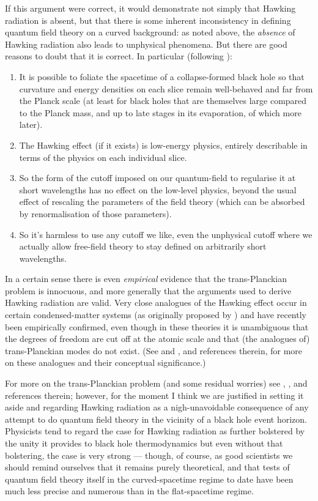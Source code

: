 \documentclass[12pt]{article}
\begin{document}
If this argument were correct, it would demonstrate not simply that Hawking radiation is absent, but that there is some inherent inconsistency in defining quantum field theory on a curved background: as noted above, the \emph{absence} of Hawking radiation also leads to unphysical phenomena. But there are good reasons to doubt that it is correct. In particular (following ):
 \begin{enumerate}
 \item It is possible to foliate the spacetime of a collapse-formed black hole so that curvature and energy densities on each slice remain well-behaved and far from the Planck scale (at least for black holes that are themselves large compared to the Planck mass, and up to late stages in its evaporation, of which more later).
 \item The Hawking effect (if it exists) is low-energy physics, entirely describable in terms of the physics on each individual slice.
 \item So the form of the cutoff imposed on our quantum-field to regularise it at short wavelengths has no effect on the low-level physics, beyond the usual effect of rescaling the parameters of the field theory (which can be absorbed by renormalisation of those parameters).
 \item So it's harmless to use any cutoff we like, even the unphysical cutoff where we actually allow free-field theory to stay defined on arbitrarily short wavelengths. 
 \end{enumerate}
In a certain sense there is even \emph{empirical} evidence that the trans-Planckian problem is innocuous, and more generally that the arguments used to derive Hawking radiation are valid. Very close analogues of the Hawking effect occur in certain condensed-matter systems (as originally proposed by ) and have recently been empirically confirmed, even though in these theories it is unambiguous that the degrees of freedom are cut off at the atomic scale and that (the analogues of) trans-Planckian modes do not exist. (See  and , and references therein, for more on these analogues and their conceptual significance.)

 For more on the trans-Planckian problem (and some residual worries) see , , and references therein; however, for the moment I think we are justified in setting it aside and regarding Hawking radiation as a nigh-unavoidable consequence of any attempt to do quantum field theory in the vicinity of a black hole event horizon. Physicists tend to regard the case for Hawking radiation as further bolstered by the unity it provides to black hole thermodynamics but even without that bolstering, the case is very strong --- though, of course, as good scientists we should remind ourselves that it remains purely theoretical, and that tests of quantum field theory itself in the curved-spacetime regime to date have been much less precise and numerous than in the flat-spacetime regime.
 
\end{document}
